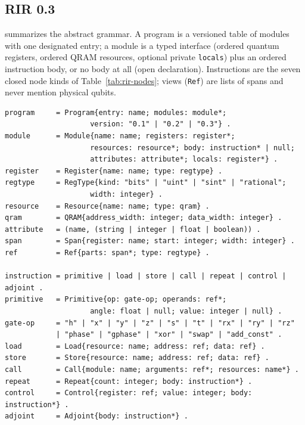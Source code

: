 \subsection{RIR 0.3}
\label{app:spec-rir}

 summarizes the abstract grammar.  A program is a
versioned table of modules with one designated entry; a module is a typed
interface (ordered quantum registers, ordered QRAM resources, optional
private \texttt{locals}) plus an ordered instruction body, or no body at
all (open declaration).  Instructions are the seven closed node kinds of
Table~\ref{tab:rir-nodes}; views (\texttt{Ref}) are lists of spans and
never mention physical qubits.

\begin{lstlisting}[style=pyqbase, caption={Abstract grammar of the RIR 0.3 object model.  $X^{*}$ denotes an ordered immutable tuple (possibly empty); \texttt{null} marks an absent body or an unused field; \texttt{name} matches \texttt{[A-Za-z\_][A-Za-z0-9\_]*}.  Shape only: alias-freedom, control protection, call matching, and numeric ranges are enforced by the semantic validator (\secref{sec:rir}).}, label={lst:rir-grammar}]
program     = Program{entry: name; modules: module*;
                    version: "0.1" | "0.2" | "0.3"} .
module      = Module{name: name; registers: register*;
                    resources: resource*; body: instruction* | null;
                    attributes: attribute*; locals: register*} .
register    = Register{name: name; type: regtype} .
regtype     = RegType{kind: "bits" | "uint" | "sint" | "rational";
                    width: integer} .
resource    = Resource{name: name; type: qram} .
qram        = QRAM{address_width: integer; data_width: integer} .
attribute   = (name, (string | integer | float | boolean)) .
span        = Span{register: name; start: integer; width: integer} .
ref         = Ref{parts: span*; type: regtype} .

instruction = primitive | load | store | call | repeat | control | adjoint .
primitive   = Primitive{op: gate-op; operands: ref*;
                    angle: float | null; value: integer | null} .
gate-op     = "h" | "x" | "y" | "z" | "s" | "t" | "rx" | "ry" | "rz"
            | "phase" | "gphase" | "xor" | "swap" | "add_const" .
load        = Load{resource: name; address: ref; data: ref} .
store       = Store{resource: name; address: ref; data: ref} .
call        = Call{module: name; arguments: ref*; resources: name*} .
repeat      = Repeat{count: integer; body: instruction*} .
control     = Control{register: ref; value: integer; body: instruction*} .
adjoint     = Adjoint{body: instruction*} .
\end{lstlisting}

